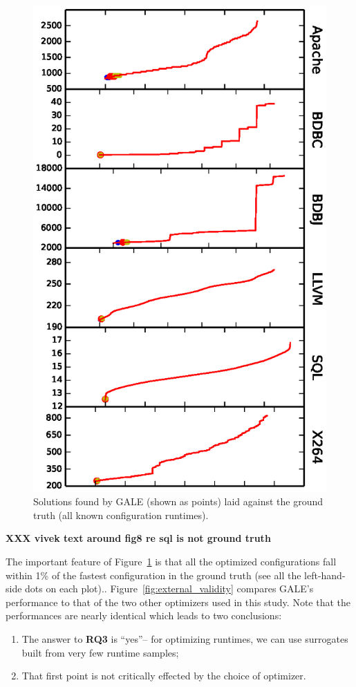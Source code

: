 \documentclass{sig-alternative}
\newcommand{\be}{\begin{enumerate}}
\newcommand{\ee}{\end{enumerate}}
\newcommand{\fig}[1]{Figure~\ref{fig:#1}}
\begin{document}
\begin{figure}[!t]
\includegraphics[width=0.9\linewidth]{Figures/optimizer_result.eps}
\caption{Solutions found by GALE (shown as points) laid against the ground truth (all known configuration runtimes).}\label{fig:performance_graph}
\end{figure}

{\bf XXX vivek text around fig8 re sql is not ground truth}

The important feature of \fig{performance_graph} is that all the optimized configurations fall within 1\% of the fastest
configuration in the ground truth (see all the left-hand-side dots on each plot).. \fig{external_validity} compares GALE's performance to that of the two other optimizers
used in this study. Note that the performances are nearly identical which leads to two conclusions:
\be
\item The answer to {\bf RQ3} is ``yes''-- for optimizing runtimes, we can use surrogates built from very few runtime samples;
\item That first point is not critically effected by the choice of optimizer.  
\ee
\end{document}
